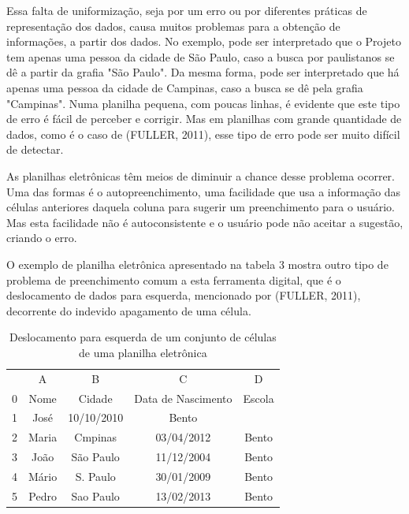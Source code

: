 Essa falta de uniformização, seja por um erro ou por diferentes práticas de representação dos dados, causa muitos problemas para a obtenção de informações, a partir dos dados. No exemplo, pode ser interpretado que o Projeto tem apenas uma pessoa da cidade de São Paulo, caso a busca por paulistanos se dê a partir da grafia "São Paulo". Da mesma forma, pode ser interpretado que há apenas uma pessoa da cidade de Campinas, caso a busca se dê pela grafia "Campinas". Numa planilha pequena, com poucas linhas, é evidente que este tipo de erro é fácil de perceber e corrigir. Mas em planilhas com grande quantidade de dados, como é o caso de (FULLER, 2011), esse tipo de erro pode ser muito difícil de detectar.

As planilhas eletrônicas têm meios de diminuir a chance desse problema ocorrer. Uma das formas é o autopreenchimento, uma facilidade que usa a informação das células anteriores daquela coluna para sugerir um preenchimento para o usuário. Mas esta facilidade não é autoconsistente e o usuário pode não aceitar a sugestão, criando o erro.

O exemplo de planilha eletrônica apresentado na tabela 3 mostra outro tipo de problema de preenchimento comum a esta ferramenta digital, que é o deslocamento de dados para esquerda,  mencionado por (FULLER, 2011), decorrente do indevido apagamento de uma célula.





\begin{table}[htb]
\tiny
\caption{\label{46fbd0359648636d3d1a778f440ffbff5530087c}Deslocamento para esquerda de um conjunto de células de uma planilha eletrônica}

\centering
\begin{tabular}{|c|c|c|c|c|}
\hline
  &  A  &  B  &  C  &  D  \\
0 & Nome  &  Cidade  &  Data de Nascimento  &  Escola \\
1 & José  &  10/10/2010  &  Bento  &   \\
2 & Maria  &  Cmpinas  &  03/04/2012  &  Bento \\
3 & João  &  São Paulo  &  11/12/2004  &  Bento \\
4 & Mário  &  S. Paulo  &  30/01/2009  &  Bento \\
5 & Pedro  &  Sao Paulo  &  13/02/2013  &  Bento \\
\hline
\end{tabular}
\end{table}



